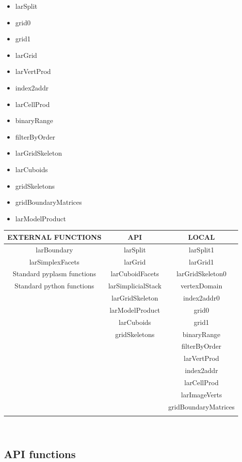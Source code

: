 \documentclass{article}
\begin{document}
\begin{itemize}
\item larSplit
\item grid0 
\item grid1
\item larGrid
\item larVertProd
\item index2addr
\item larCellProd
\item binaryRange
\item filterByOrder
\item larGridSkeleton
\item larCuboids
\item gridSkeletons
\item gridBoundaryMatrices
\item larModelProduct
\end{itemize}
\begin{center}
\begin{tabular}{ccc}
\\
\hline
{EXTERNAL FUNCTIONS}& API& LOCAL\\
\hline
larBoundary& larSplit& larSplit1\\
\hline
larSimplexFacets& larGrid& larGrid1\\
\hline
{Standard pyplasm functions}& larCuboidFacets& larGridSkeleton0\\
\hline
{Standard python functions}& larSimplicialStack& vertexDomain\\
\hline
& larGridSkeleton& index2addr0\\
\hline
& larModelProduct& grid0\\
\hline
& larCuboids& grid1\\
\hline
& gridSkeletons& binaryRange\\
\hline
& & filterByOrder\\
\hline
& &	larVertProd\\
\hline
& & index2addr\\
\hline
& &	larCellProd\\
\hline
& &	larImageVerts\\
\hline
& & gridBoundaryMatrices\\
\hline
\\
\end{tabular}\\
\end{center}
\subsection{API functions}
\end{document}
